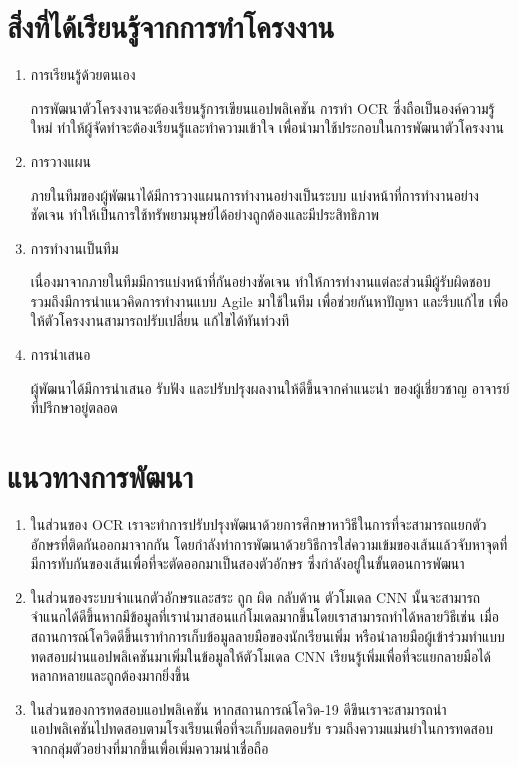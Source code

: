 \documentclass[12pt,oneside,openright,a4paper]{cpe-thai-project}
\begin{document}
\section{สิ่งที่ได้เรียนรู้จากการทำโครงงาน}
\begin{enumerate}
  \item การเรียนรู้ด้วยตนเอง\par
  การพัฒนาตัวโครงงานจะต้องเรียนรู้การเขียนแอปพลิเคชัน
  การทำ OCR ซึ่งถือเป็นองค์ความรู้ใหม่ ทำให้ผู้จัดทำจะต้องเรียนรู้และทำความเข้าใจ
  เพื่อนำมาใช้ประกอบในการพัฒนาตัวโครงงาน
  \item การวางแผน\par
  ภายในทีมของผู้พัฒนาได้มีการวางแผนการทำงานอย่างเป็นระบบ
  แบ่งหน้าที่การทำงานอย่างชัดเจน 
  ทำให้เป็นการใช้ทรัพยามนุษย์ได้อย่างถูกต้องและมีประสิทธิภาพ
  \item การทำงานเป็นทีม\par
  เนื่องมาจากภายในทีมมีการแบ่งหน้าที่กันอย่างชัดเจน
  ทำให้การทำงานแต่ละส่วนมีผู้รับผิดชอบ รวมถึงมีการนำแนวคิดการทำงานแบบ Agile
  มาใช้ในทีม เพื่อช่วยกันหาปัญหา และรีบแก้ไข เพื่อให้ตัวโครงงานสามารถปรับเปลี่ยน
  แก้ไขได้ทันท่วงที
  \item การนำเสนอ\par
  ผู้พัฒนาได้มีการนำเสนอ รับฟัง และปรับปรุงผลงานให้ดีขึ้นจากคำแนะนำ
  ของผู้เชี่ยวชาญ อาจารย์ที่ปรึกษาอยู่ตลอด
\end{enumerate}
\section{แนวทางการพัฒนา}
\begin{enumerate}
  \item ในส่วนของ OCR เราจะทำการปรับปรุงพัฒนาด้วยการศึกษาหาวิธีในการที่จะสามารถแยกตัวอักษรที่ติดกันออกมาจากกัน โดยกำลังทำการพัฒนาด้วยวิธีการใส่ความเข้มของเส้นแล้วจับหาจุดที่มีการทับกันของเส้นเพื่อที่จะตัดออกมาเป็นสองตัวอักษร ซึ่งกำลังอยู่ในขั้นตอนการพัฒนา
  \item ในส่วนของระบบจำแนกตัวอักษรและสระ ถูก ผิด กลับด้าน
        ตัวโมเดล CNN นั้นจะสามารถจำแนกได้ดีขึ้นหากมีข้อมูลที่เรานำมาสอนแก่โมเดลมากขึ้นโดยเราสามารถทำได้หลายวิธีเช่น เมื่อสถานการณ์โควิดดีขึ้นเราทำการเก็บข้อมูลลายมือของนักเรียนเพิ่ม หรือนำลายมือผู้เข้าร่วมทำแบบทดสอบผ่านแอปพลิเคชันมาเพิ่มในข้อมูลให้ตัวโมเดล CNN เรียนรู้เพิ่มเพื่อที่จะแยกลายมือได้หลากหลายและถูกต้องมากยิ่งขึ้น
  \item ในส่วนของการทดสอบแอปพลิเคชัน หากสถานการณ์โควิด-19 ดีขึนเราจะสามารถนำแอปพลิเคชันไปทดสอบตามโรงเรียนเพื่อที่จะเก็บผลตอบรับ รวมถึงความแม่นยำในการทดสอบจากกลุ่มตัวอย่างที่มากขึ้นเพื่อเพิ่มความน่าเชื่อถือ
\end{enumerate}


\nocite{*}


\end{document}
